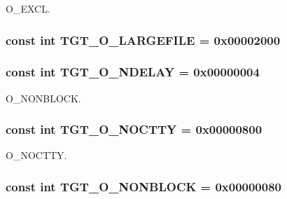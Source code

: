 O\_\-EXCL. \hypertarget{classSparcSolaris_a9600e092a6309f94d92129ce5f85b945}{
\subsubsection[{TGT\_\-O\_\-LARGEFILE}]{\setlength{\rightskip}{0pt plus 5cm}const int {\bf TGT\_\-O\_\-LARGEFILE} = 0x00002000}}
\label{classSparcSolaris_a9600e092a6309f94d92129ce5f85b945}
\hypertarget{classSparcSolaris_ac13381222e564483ac5408b9fac7c60f}{
\subsubsection[{TGT\_\-O\_\-NDELAY}]{\setlength{\rightskip}{0pt plus 5cm}const int {\bf TGT\_\-O\_\-NDELAY} = 0x00000004}}
\label{classSparcSolaris_ac13381222e564483ac5408b9fac7c60f}


O\_\-NONBLOCK. \hypertarget{classSparcSolaris_adfd4240281579e5f60c5e22c601225d8}{
\subsubsection[{TGT\_\-O\_\-NOCTTY}]{\setlength{\rightskip}{0pt plus 5cm}const int {\bf TGT\_\-O\_\-NOCTTY} = 0x00000800}}
\label{classSparcSolaris_adfd4240281579e5f60c5e22c601225d8}


O\_\-NOCTTY. \hypertarget{classSparcSolaris_a0ea5420b4c9b45ba342a266fb77ac942}{
\subsubsection[{TGT\_\-O\_\-NONBLOCK}]{\setlength{\rightskip}{0pt plus 5cm}const int {\bf TGT\_\-O\_\-NONBLOCK} = 0x00000080}}
\label{classSparcSolaris_a0ea5420b4c9b45ba342a266fb77ac942}


